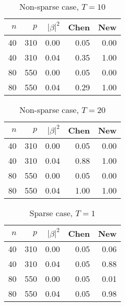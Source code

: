 \documentclass[review]{elsarticle}
\theoremstyle{plain}
\theoremstyle{definition}
\theoremstyle{remark}
\begin{document}
\begin{table}[ht]
\centering
\begin{tabular}{rrrrr}
      \hline
          $n$ & $p$ & $|\beta|^2$ & Chen & New \\ 
        \hline
    40 & 310 & 0.00 & 0.05 & 0.00 \\ 
      40 & 310 & 0.04 & 0.35 & 1.00 \\ 
        80 & 550 & 0.00 & 0.05 & 0.00 \\ 
          80 & 550 & 0.04 & 0.29 & 1.00 \\ 
                         \hline
\end{tabular}
    \caption{Non-sparse case, $T=10$}
\end{table}

\begin{table}[ht]
\centering
\begin{tabular}{rrrrr}
      \hline
          $n$ & $p$ & $|\beta|^2$ & Chen & New \\ 
        \hline
        40 & 310 & 0.00 & 0.05 & 0.00 \\ 
          40 & 310 & 0.04 & 0.88 & 1.00 \\ 
            80 & 550 & 0.00 & 0.05 & 0.00 \\ 
              80 & 550 & 0.04 & 1.00 & 1.00 \\ 
                         \hline
\end{tabular}
    \caption{Non-sparse case, $T=20$}
\end{table}

\begin{table}[ht]
    \centering
    \begin{tabular}{rrrrr}
          \hline
          $n$ & $p$ & $|\beta|^2$ & Chen & New \\ 
            \hline
                             40 & 310 & 0.00 & 0.05 & 0.06 \\ 
                               40 & 310 & 0.04 & 0.05 & 0.88 \\ 
                                 80 & 550 & 0.00 & 0.05 & 0.01 \\ 
                                   80 & 550 & 0.04 & 0.05 & 0.98 \\ 
                             \hline
    \end{tabular}
    \caption{Sparse case, $T=1$}
\end{table}
\end{document}
